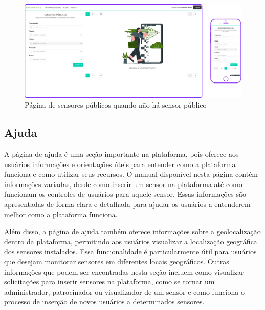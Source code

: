 \documentclass[tcc,capa]{texufpel}
\begin{document}
\begin{figure}[htbp]
  \centering \includegraphics[scale=.2]{assets/sensorespublicosnull.png}
  \caption{Página de sensores públicos quando não há sensor público}
  \label{publicosnull}
\end{figure}
\newpage
\subsection{Ajuda}
\label{sec:paginaajuda}
A página de ajuda é uma seção importante na plataforma, pois oferece aos usuários informações e orientações úteis para entender como a plataforma funciona e como utilizar seus recursos. O manual disponível nesta página contém informações variadas, desde como inserir um sensor na plataforma até como funcionam os controles de usuários para aquele sensor. Essas informações são apresentadas de forma clara e detalhada para ajudar os usuários a entenderem melhor como a plataforma funciona.

Além disso, a página de ajuda também oferece informações sobre a geolocalização dentro da plataforma, permitindo aos usuários visualizar a localização geográfica dos sensores instalados. Essa funcionalidade é particularmente útil para usuários que desejam monitorar sensores em diferentes locais geográficos.
Outras informações que podem ser encontradas nesta seção incluem como visualizar solicitações para inserir sensores na plataforma, como se tornar um administrador, patrocinador ou visualizador de um sensor e como funciona o processo de inserção de novos usuários a determinados sensores.
\end{document}
